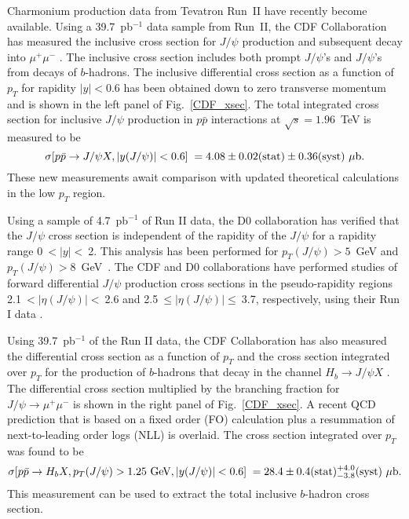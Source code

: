 Charmonium production data from Tevatron Run~II have recently become
available. Using a 39.7~pb$^{-1}$ data sample from Run~II, the CDF
Collaboration has measured the inclusive cross section for $J/\psi$
production and subsequent decay into $\mu^+\mu^-$ \cite{CDF_LP03}. 
The inclusive cross section includes both prompt $J/\psi$'s 
and $J/\psi$'s from decays of $b$-hadrons.
The inclusive differential cross section as a function of $p_T$ for rapidity 
$|y|<0.6$ has been obtained down to zero transverse momentum and is 
shown in the left panel of Fig.~\ref{CDF_xsec}. The total integrated cross
section for inclusive $J/\psi$ production in $p\bar{p}$ interactions at
$\sqrt{s} = 1.96$~TeV is measured to be
\begin{equation}
\sigma[p\bar{p} \rightarrow J/\psi X, |y(J/\psi)|<0.6 ] \; 
= 4.08 \pm 0.02({\rm stat}) \pm 0.36(\rm {syst})~{\mu\rm b}.
\label{exeq1}
\end{equation}
These new measurements await comparison
with updated theoretical calculations in the low $p_T$ region.

Using a sample of 4.7~pb$^{-1}$ of Run II data, the D0 collaboration
has verified that the $J/\psi$ cross section is independent of the
rapidity of the $J/\psi$ for a rapidity range 0$~<|y|<~$2.  
This analysis has been performed for $p_T(J/\psi)
>5$~GeV and $p_T(J/\psi) > 8$~GeV~\cite{D0_LP03}.
The CDF and D0 collaborations have performed studies of forward 
 differential $J/\psi$ production cross sections 
in the pseudo-rapidity regions
2.1$~<|\eta (J/\psi)| <~$2.6 and 2.5$~\leq |\eta (J/\psi)| \leq~$3.7, 
respectively, using their Run I data  \cite{CDF_Iforw, D0_Iforw}. 

  Using 39.7~pb$^{-1}$ of the Run II data, the CDF Collaboration has also
measured the differential cross section as a function of $p_T$ and the
cross section integrated over $p_T$ for the production of $b$-hadrons
that decay in the channel $H_b \rightarrow J/\psi X$ \cite{CDF_LP03}.
The differential cross section multiplied by the branching fraction for
$J/\psi \to \mu^+ \mu^-$ is shown in the right panel of
Fig.~\ref{CDF_xsec}. A recent QCD prediction that is based on a fixed
order (FO) calculation plus a resummation of next-to-leading order logs
(NLL) \cite{Cacciari:2004} is overlaid. The cross section integrated
over $p_T$ was found to be
\begin{equation}
\sigma[p\bar{p} \rightarrow H_b X, p_T(J/\psi)> 1.25~ {\rm GeV}, 
|y(J/\psi)|<0.6] \;
= 28.4 \pm 0.4({\rm stat}) ^{+4.0}_{-3.8} (\rm {syst})~{\mu\rm b}.
\label{exeq2}
\end{equation}
This measurement can be used to extract the total inclusive $b$-hadron
cross section.


